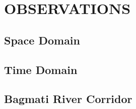 \clearpage
\section{OBSERVATIONS}

\subsection{Space Domain}

\subsection{Time Domain}

\subsection{Bagmati River Corridor}




